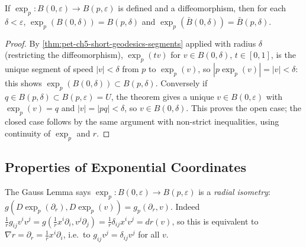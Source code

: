 \begin{corollary}
  \label{cor:pet-ch5-metric-ball-image}
  If $\exp_p:B(0,\varepsilon)\to B(p,\varepsilon)$ is defined and a diffeomorphism,
  then for each $\delta<\varepsilon$, $\exp_p(B(0,\delta))=B(p,\delta)$ and
  $\exp_p(\bar B(0,\delta))=\bar B(p,\delta)$.
\end{corollary}
\begin{proof}
  By \cref{thm:pet-ch5-short-geodesics-segments} applied with radius $\delta$
  (restricting the diffeomorphism), $\exp_p(tv)$ for $v\in B(0,\delta)$, $t\in[0,1]$,
  is the unique segment of speed $|v|<\delta$ from $p$ to $\exp_p(v)$, so
  $|p\exp_p(v)|=|v|<\delta$: this shows $\exp_p(B(0,\delta))\subset B(p,\delta)$.
  Conversely if $q\in B(p,\delta)\subset B(p,\varepsilon)=U$, the theorem gives a
  unique $v\in B(0,\varepsilon)$ with $\exp_p(v)=q$ and $|v|=|pq|<\delta$, so
  $v\in B(0,\delta)$. This proves the open case; the closed case follows by the same
  argument with non-strict inequalities, using continuity of $\exp_p$ and $r$.
\end{proof}

\subsection{Properties of Exponential Coordinates}

\begin{remark}
  \label{rem:pet-ch5-radial-isometry}
  \leanok
  The Gauss Lemma says $\exp_p:B(0,\varepsilon)\to B(p,\varepsilon)$ is a
  \emph{radial isometry}: $g(D\exp_p(\partial_r),D\exp_p(v))=g_p(\partial_r,v)$.
  Indeed $\tfrac1rg_{ij}v^iv^j=g(\tfrac1rx^i\partial_i,v^j\partial_j)=
  \tfrac1r\delta_{ij}x^iv^j=dr(v)$, so this is equivalent to $\nabla r=\partial_r=
  \tfrac1rx^i\partial_i$, i.e.\ to $g_{ij}v^j=\delta_{ij}v^j$ for all $v$.
\end{remark}

